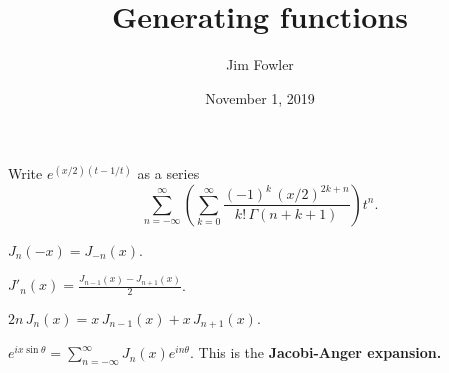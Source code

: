 \documentclass{homework}
\author{Jim Fowler}
\title{Generating functions}
\date{November 1, 2019}
\begin{document}
\maketitle

\begin{problem}
  Write \(e^{(x/2)(t - 1/t)}\) as a series
  \[
    \sum_{n=-\infty}^\infty \left( \sum_{k=0}^\infty \frac{(-1)^k \, (x/2)^{2k + n}}{k! \, \Gamma( n + k + 1)}  \right) t^n.
  \]
\end{problem}

\vfill

\begin{problem}
  $J_n(-x) = J_{-n}(x)$.
\end{problem}

\vfill

\begin{problem}
  $J'_n(x) = \frac{J_{n-1}(x) - J_{n+1}(x)}{2}$.
\end{problem}

\vfill

\begin{problem}
  $2 n \, J_n(x) = x \, J_{n-1}(x) + x \,  J_{n+1}(x)$.
\end{problem}

\vfill

\begin{problem}
  $e^{i x \sin \theta} = \sum_{n=-\infty}^\infty J_n(x) e^{i n \theta}$.  This is the \textbf{Jacobi-Anger expansion.}
\end{problem}

\vfill
\end{document}
